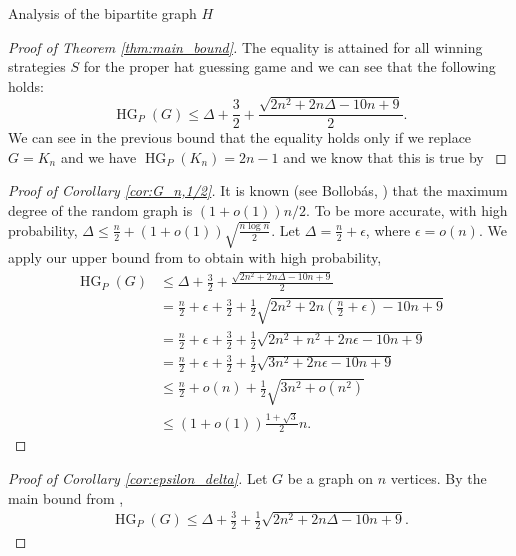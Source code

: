 \documentclass[11pt, letterpaper]{article}
\theoremstyle{plain}
\theoremstyle{plain}
\begin{document}
\begin{section}{Analysis of the bipartite graph $H$}
\begin{proof}[Proof of Theorem \ref{thm:main_bound}]
The equality is attained for all winning strategies $S$ for the proper hat guessing game and we can see that the following holds:
$$\operatorname{HG}_{P}(G) \leq \Delta+\frac{3}{2}+ \frac{\sqrt{2n^{2}+2n\Delta-10n+9}}{2}. $$
We can see in the previous bound that the equality holds only if we replace $G = K_{n}$ and we have  $\operatorname{HG}_{P}(K_n) = 2n-1$ and we know that this is true by \cite{adriaensen2026hatguessingpropercolorings}
\end{proof}

\newpage
\begin{proof}[Proof of Corollary \ref{cor:G_n,1/2}] 
    It is known (see Bollobás, \cite{bollobas2001random}) that the maximum degree of the random graph is $(1+o(1))n/2$. To be more accurate, with high probability, $\Delta \leq \frac n 2 + (1+o(1)) \sqrt{\frac{n\log n}2}$. Let $\Delta = \frac n 2+ \epsilon$, where $\epsilon=o(n)$. We apply our upper bound from  to obtain with high probability,
    \begin{align*}
        \operatorname{HG}_{P}(G) &\leq \Delta + \frac{3}{2} + \frac{\sqrt{2n^2 + 2n\Delta - 10n + 9}}{2}
        \\&= \frac n 2 + \epsilon + \frac 3 2 + \frac 1 2 \sqrt{2n^2 + 2n\left(\frac n 2 + \epsilon\right) - 10n + 9}
        \\&= \frac n 2 + \epsilon + \frac 3 2 + \frac 1 2 \sqrt{2n^2 + n^2 + 2n\epsilon - 10n + 9}
        \\&= \frac n 2 + \epsilon + \frac 3 2 + \frac 1 2 \sqrt{3n^2 + 2n\epsilon - 10n + 9}
        \\&\leq \frac n 2 + o(n) + \frac 1 2 \sqrt{3n^2 + o(n^2)}
        \\&\leq (1+o(1)) \frac{1+\sqrt 3}{2}n.
    \end{align*}

\end{proof}
\begin{proof}[Proof of Corollary \ref{cor:epsilon_delta}]
Let $G$ be a graph on $n$ vertices. By the main bound from  ,
\begin{align*}
\operatorname{HG}_{P}(G) \leq \Delta + \frac{3}{2} + \frac{1}{2}\sqrt{2n^2 + 2n\Delta - 10n + 9}.
\end{align*}


\end{proof}
\end{section}
\end{document}

